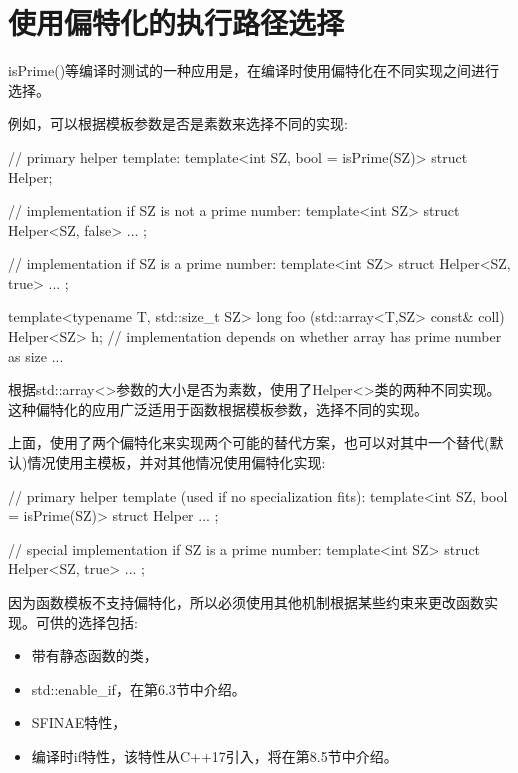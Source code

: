 \section{使用偏特化的执行路径选择}
isPrime()等编译时测试的一种应用是，在编译时使用偏特化在不同实现之间进行选择。

例如，可以根据模板参数是否是素数来选择不同的实现:

\begin{cpp}
// primary helper template:
template<int SZ, bool = isPrime(SZ)>
struct Helper;

// implementation if SZ is not a prime number:
template<int SZ>
struct Helper<SZ, false>
{
	...
};

// implementation if SZ is a prime number:
template<int SZ>
struct Helper<SZ, true>
{
	...
};

template<typename T, std::size_t SZ>
long foo (std::array<T,SZ> const& coll)
{
	Helper<SZ> h; // implementation depends on whether array has prime number as size
	...
}
\end{cpp}

根据std::array<>参数的大小是否为素数，使用了Helper<>类的两种不同实现。这种偏特化的应用广泛适用于函数根据模板参数，选择不同的实现。

上面，使用了两个偏特化来实现两个可能的替代方案，也可以对其中一个替代(默认)情况使用主模板，并对其他情况使用偏特化实现:

\begin{cpp}
// primary helper template (used if no specialization fits):
template<int SZ, bool = isPrime(SZ)>
struct Helper
{
	...
};

// special implementation if SZ is a prime number:
template<int SZ>
struct Helper<SZ, true>
{
	...
};
\end{cpp}

因为函数模板不支持偏特化，所以必须使用其他机制根据某些约束来更改函数实现。可供的选择包括:

\begin{itemize}
\item 
带有静态函数的类，

\item 
std::enable\_if，在第6.3节中介绍。

\item 
SFINAE特性，

\item 
编译时if特性，该特性从C++17引入，将在第8.5节中介绍。
\end{itemize}

